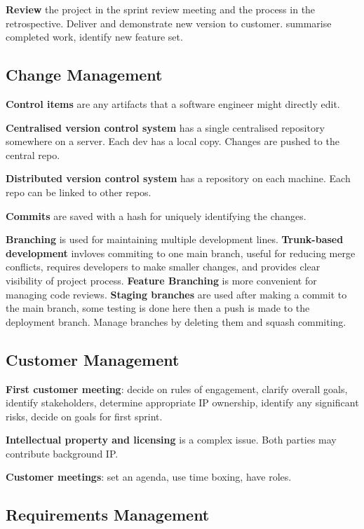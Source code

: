 \documentclass{article}
\begin{document}
\noindent \textbf{Review} the project in the sprint review meeting and the process in the retrospective. Deliver and demonstrate new version to customer.
summarise completed work, identify new feature set.


\subsection*{Change Management}

\noindent \textbf{Control items} are any artifacts that a software engineer might directly edit.

\noindent \textbf{Centralised version control system} has a single centralised repository somewhere on a server.
Each dev has a local copy. Changes are pushed to the central repo.

\noindent \textbf{Distributed version control system} has a repository on each machine.
Each repo can be linked to other repos.

\noindent \textbf{Commits} are saved with a hash for uniquely identifying the changes.

\noindent \textbf{Branching} is used for maintaining multiple development lines. 
\textbf{Trunk-based development} invloves commiting to one main branch, useful for reducing merge conflicts, requires developers to make smaller changes, 
and provides clear visibility of project process.
\textbf{Feature Branching} is more convenient for managing code reviews.
\textbf{Staging branches} are used after making a commit to the main branch, some testing is done here then a push is made to the deployment branch.
Manage branches by deleting them and squash commiting.


\subsection*{Customer Management}

\noindent \textbf{First customer meeting}: decide on rules of engagement, clarify overall goals, identify stakeholders, determine appropriate IP ownership,
identify any significant risks, decide on goals for first sprint.

\noindent \textbf{Intellectual property and licensing} is a complex issue. Both parties may contribute background IP.\@

\noindent \textbf{Customer meetings}: set an agenda, use time boxing, have roles.


\subsection*{Requirements Management}
\end{document}
